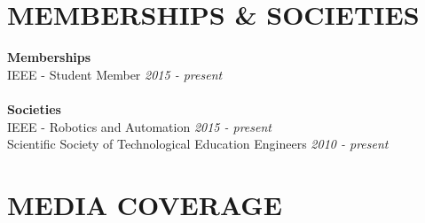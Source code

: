 \documentclass[11pt]{res} %
\begin{document}
\begin{resume}
\vspace{0in} %

\section{MEMBERSHIPS \& SOCIETIES}

\vspace{5pt} %

\small \textbf{Memberships}\\IEEE - Student Member \hfill{\it 2015 - present}
\\\\\small \textbf{Societies}\\IEEE - Robotics and Automation \hfill{\it 2015 - present}\\
Scientific Society of Technological Education Engineers \hfill{\it 2010 - present}

\vspace{0in} %



\section{MEDIA COVERAGE}


\end{resume}
\end{document}
